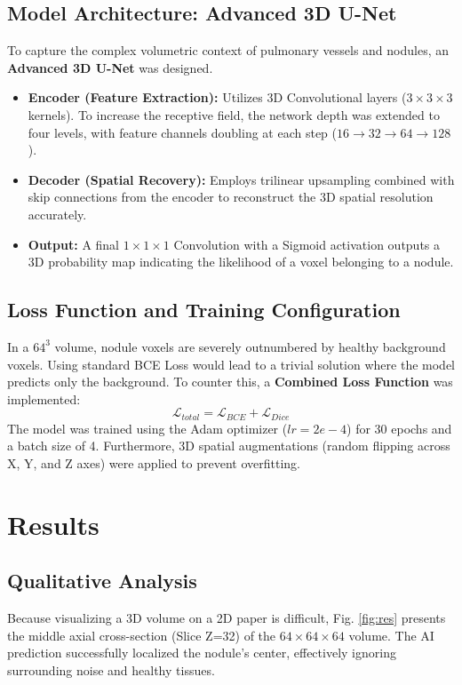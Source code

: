 \documentclass[conference]{IEEEtran}
\begin{document}
\subsection{Model Architecture: Advanced 3D U-Net}
To capture the complex volumetric context of pulmonary vessels and nodules, an \textbf{Advanced 3D U-Net} was designed.
\begin{itemize}
    \item \textbf{Encoder (Feature Extraction):} Utilizes 3D Convolutional layers ($3 \times 3 \times 3$ kernels). To increase the receptive field, the network depth was extended to four levels, with feature channels doubling at each step ($16 \rightarrow 32 \rightarrow 64 \rightarrow 128$).
    \item \textbf{Decoder (Spatial Recovery):} Employs trilinear upsampling combined with skip connections from the encoder to reconstruct the 3D spatial resolution accurately.
    \item \textbf{Output:} A final $1 \times 1 \times 1$ Convolution with a Sigmoid activation outputs a 3D probability map indicating the likelihood of a voxel belonging to a nodule.
\end{itemize}

\subsection{Loss Function and Training Configuration}
In a $64^3$ volume, nodule voxels are severely outnumbered by healthy background voxels. Using standard BCE Loss would lead to a trivial solution where the model predicts only the background. To counter this, a \textbf{Combined Loss Function} was implemented:
$$ \mathcal{L}_{total} = \mathcal{L}_{BCE} + \mathcal{L}_{Dice} $$
The model was trained using the Adam optimizer ($lr=2e-4$) for 30 epochs and a batch size of 4. Furthermore, 3D spatial augmentations (random flipping across X, Y, and Z axes) were applied to prevent overfitting.

\section{Results}

\subsection{Qualitative Analysis}
Because visualizing a 3D volume on a 2D paper is difficult, Fig. \ref{fig:res} presents the middle axial cross-section (Slice Z=32) of the $64 \times 64 \times 64$ volume. The AI prediction successfully localized the nodule's center, effectively ignoring surrounding noise and healthy tissues.
\end{document}
